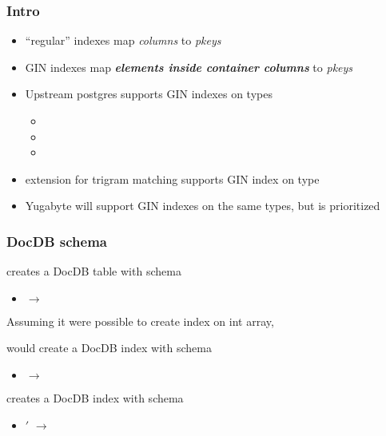 \begin{frame}
  \titlepage
  \hypertarget{titlePage}{}
\end{frame}

\begin{frame}
  \frametitle{Intro}
  \begin{itemize}
    \item ``regular'' indexes map \emph{columns} to \emph{pkeys}
      \pause
    \item GIN indexes map \textbf{\emph{elements inside container columns}} to
      \emph{pkeys}
      \pause
    \item Upstream postgres supports GIN indexes on types
      \begin{itemize}
        \item {}
        \item {}
        \item {}
      \end{itemize}
      \pause
    \item {} extension for trigram matching supports GIN
      index on type 
      \pause
    \item Yugabyte will support GIN indexes on the same types, but
       is prioritized
  \end{itemize}
\end{frame}

\begin{frame}
  \frametitle{DocDB schema}

  creates a DocDB table with schema
  \begin{itemize}
    \item {} $\rightarrow$ 
  \end{itemize}
  \pause

  Assuming it were possible to create index on int array,


  would create a DocDB index with schema
  \begin{itemize}
    \item {} $\rightarrow$ 
  \end{itemize}
  \pause


  creates a DocDB index with schema
  \begin{itemize}
    \item {}$'$ $\rightarrow$ 
  \end{itemize}
\end{frame}

